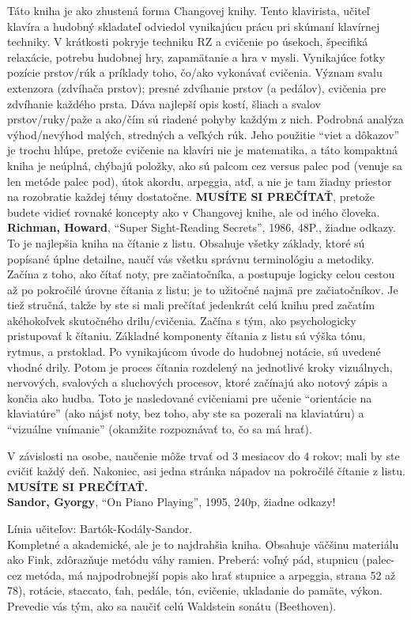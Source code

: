 Táto kniha je ako zhustená forma Changovej knihy. Tento klavirista, učiteľ klavíra a hudobný skladateľ odviedol vynikajúcu prácu pri skúmaní klavírnej techniky. V krátkosti pokryje techniku RZ a cvičenie po úsekoch, špecifiká relaxácie, potrebu hudobnej hry, zapamätanie a hra v mysli. Vynikajúce fotky pozície prstov/rúk a príklady toho, čo/ako vykonávať cvičenia. Význam svalu extenzora (zdvíhača prstov); presné zdvíhanie prstov (a pedálov), cvičenia pre zdvíhanie každého prsta. Dáva najlepší opis kostí, šliach a svalov prstov/ruky/paže a ako/čím   sú riadené pohyby každým z nich. Podrobná analýza výhod/nevýhod malých, stredných a veľkých rúk. Jeho použitie “viet a dôkazov” je trochu hlúpe, pretože cvičenie na klavíri nie je matematika, a táto kompaktná kniha je neúplná, chýbajú položky, ako sú palcom cez versus palec pod (venuje sa len metóde palec pod), útok akordu, arpeggia, atď, a nie je tam žiadny priestor na rozobratie každej témy dostatočne. \textbf{MUSÍTE SI PREČÍTAŤ}, pretože budete vidieť rovnaké koncepty ako v Changovej knihe, ale od iného človeka.
\medskip\\
\textbf{Richman, Howard}, “Super Sight-Reading Secrets”, 1986, 48P., žiadne odkazy. To je najlepšia kniha na čítanie z listu. Obsahuje všetky základy, ktoré sú popísané úplne detailne, naučí vás všetku správnu terminológiu a metodiky. Začína z toho, ako čítať noty, pre začiatočníka, a postupuje logicky celou cestou až po pokročilé úrovne čítania z listu; je to užitočné najmä pre začiatočníkov. Je tiež stručná, takže by ste si mali prečítať jedenkrát celú knihu pred začatím akéhokoľvek skutočného drilu/cvičenia. Začína s tým, ako psychologicky pristupovať k čítaniu. Základné komponenty čítania z listu sú výška tónu, rytmus, a prstoklad. Po vynikajúcom úvode do hudobnej notácie, sú uvedené vhodné drily. Potom je proces čítania rozdelený na jednotlivé kroky vizuálnych, nervových, svalových a sluchových procesov, ktoré začínajú ako notový zápis a končia ako hudba. Toto je nasledované cvičeniami pre učenie “orientácie na klaviatúre” (ako nájsť noty, bez toho, aby ste sa pozerali na klaviatúru) a “vizuálne vnímanie” (okamžite rozpoznávať to, čo sa má hrať). 

V závislosti na osobe, naučenie môže trvať od 3 mesiacov do 4 rokov; mali by ste cvičiť každý deň. Nakoniec, asi jedna stránka nápadov na pokročilé čítanie z listu. \textbf{MUSÍTE SI PREČÍTAŤ.}
\medskip\\
\textbf{Sandor, Gyorgy}, “On Piano Playing”, 1995, 240p, žiadne odkazy!

Línia učiteľov: Bartók-Kodály-Sandor.\\
Kompletné a akademické, ale je to najdrahšia kniha. Obsahuje väčšinu materiálu ako Fink, zdôrazňuje metódu váhy ramien. Preberá: voľný pád, stupnicu (palec-cez metóda, má najpodrobnejší popis ako hrať stupnice a arpeggia, strana 52 až 78), rotácie, staccato, ťah, pedále, tón, cvičenie, ukladanie do pamäte, výkon. Prevedie vás tým, ako sa naučiť celú Waldstein sonátu (Beethoven). 

